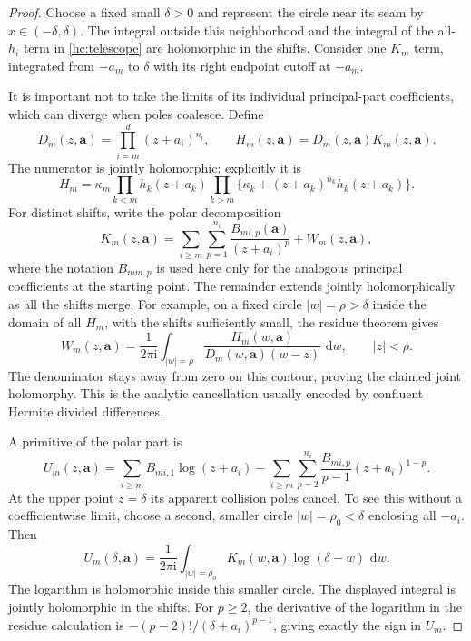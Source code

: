 \documentclass[11pt,a4paper]{article}
\numberwithin{equation}{section}
\theoremstyle{definition}
\theoremstyle{remark}
\newcommand{\dd}{\,\mathrm d}
\newcommand{\ii}{\mathrm i}
\begin{document}
\begin{proof}
Choose a fixed small $\delta>0$ and represent the circle near its seam
by $x\in(-\delta,\delta)$. The integral outside this neighborhood and
the integral of the all-$h_i$ term in \eqref{hc:telescope} are
holomorphic in the shifts. Consider one $K_m$ term, integrated from
$-a_m$ to $\delta$ with its right endpoint cutoff at $-a_m$.

It is important not to take the limits of its individual principal-part
coefficients, which can diverge when poles coalesce. Define
\[
 D_m(z,\boldsymbol a)=\prod_{i=m}^d(z+a_i)^{n_i},\qquad
 H_m(z,\boldsymbol a)=D_m(z,\boldsymbol a)K_m(z,\boldsymbol a).
\]
The numerator is jointly holomorphic: explicitly it is
\[
 H_m=\kappa_m\prod_{k<m}h_k(z+a_k)
       \prod_{k>m}\bigl\{\kappa_k+(z+a_k)^{n_k}h_k(z+a_k)\bigr\}.
\]
For distinct shifts, write the polar decomposition
\[
 K_m(z,\boldsymbol a)
   =\sum_{i\ge m}\sum_{p=1}^{n_i}
          \frac{B_{mi,p}(\boldsymbol a)}{(z+a_i)^p}
       +W_m(z,\boldsymbol a),
\]
where the notation $B_{mm,p}$ is used here only for the analogous
principal coefficients at the starting point.
The remainder extends jointly holomorphically as all the shifts merge.
For example, on a fixed circle $|w|=\rho>\delta$ inside the domain of
all $H_m$, with the shifts sufficiently small, the residue theorem gives
\begin{equation}\label{hc:Hermite}
 W_m(z,\boldsymbol a)=\frac1{2\pi\ii}
 \int_{|w|=\rho}\frac{H_m(w,\boldsymbol a)}
  {D_m(w,\boldsymbol a)(w-z)}\,\dd w,\qquad |z|<\rho.
\end{equation}
The denominator stays away from zero on this contour, proving the
claimed joint holomorphy. This is the analytic cancellation usually
encoded by confluent Hermite divided differences.

A primitive of the polar part is
\[
 U_m(z,\boldsymbol a)=
 \sum_{i\ge m} B_{mi,1}\log(z+a_i)
 -\sum_{i\ge m}\sum_{p=2}^{n_i}
       \frac{B_{mi,p}}{p-1}(z+a_i)^{1-p}.
\]
At the upper point $z=\delta$ its apparent collision poles cancel.
To see this without a coefficientwise limit, choose a second, smaller
circle $|w|=\rho_0<\delta$ enclosing all $-a_i$. Then
\begin{equation}\label{hc:upper}
 U_m(\delta,\boldsymbol a)=\frac1{2\pi\ii}
  \int_{|w|=\rho_0}K_m(w,\boldsymbol a)
                         \log(\delta-w)\,\dd w.
\end{equation}
The logarithm is holomorphic inside this smaller circle. The displayed
integral is jointly holomorphic in the shifts. For $p\ge2$, the derivative
of the logarithm in the residue calculation is
$-(p-2)!/(\delta+a_i)^{p-1}$, giving exactly the sign in $U_m$.


\end{proof}
\end{document}
